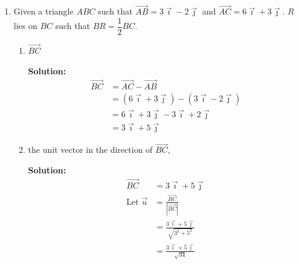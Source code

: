 \documentclass{report}
\newcommand{\sol}{\textbf{Solution:}}
\begin{document}
\begin{enumerate}[leftmargin=*]
\begin{enumerate}
\begin{enumerate}
                              \sol{}
                              \begin{align*}
                                  \log _p 48 & = \frac{\log _4 (4^2 \times 3)}{\log _4 p} \\
                                             & = \frac{2\log _4 4 + \log _4 3}{x}         \\
                                             & = \frac{2 + \dfrac{\log_p 3}{\log_p 4}}{x} \\
                                             & = \frac{2 + \dfrac{\log_4 p}{\log_3 p}}{x} \\
                                             & = \frac{2 + \dfrac{x}{y}}{x}               \\
                                             & = \frac{2y + x}{xy}
                              \end{align*}
                    \end{enumerate}
          \end{enumerate}

    \item Given a triangle $A B C$ such that $\overrightarrow{A B}=3 \vec{\imath}-2
              \vec{\jmath}$ and $\overrightarrow{A C}=6\vec{\imath} + 3\vec{\jmath}$. $R$
          lies on $B C$ such that $B R=\dfrac{1}{2} B C$.
          \begin{enumerate}
              \item $\overrightarrow{B C}$

                    \sol{}
                    \begin{align*}
                        \overrightarrow{B C} & = {\overrightarrow{AC}} - {\overrightarrow{AB}}                   \\
                                             & = (6\vec{\imath} + 3\vec{\jmath}) - (3\vec{\imath}-2\vec{\jmath}) \\
                                             & = 6\vec{\imath} + 3\vec{\jmath} - 3\vec{\imath} + 2\vec{\jmath}   \\
                                             & = 3\vec{\imath} + 5\vec{\jmath}
                    \end{align*}

                    \newpage
              \item the unit vector in the direction of $\overrightarrow{B C}$,

                    \sol{}
                    \begin{align*}
                        \overrightarrow{B C} & = 3\vec{\imath} + 5\vec{\jmath}                        \\
                        \text{Let } \vec{u}  & = \frac{\overrightarrow{B C}}{|\overrightarrow{B C}|}  \\
                                             & = \frac{3\vec{\imath} + 5\vec{\jmath}}{\sqrt{3^2+5^2}} \\
                                             & = \frac{3\vec{\imath} + 5\vec{\jmath}}{\sqrt{34}}
                    \end{align*}


\end{enumerate}
\end{enumerate}
\end{document}
